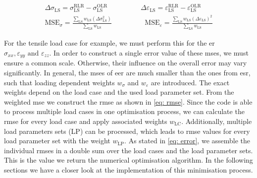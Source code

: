 \begin{gather}
    \label{eq: EMDifference}
    \Delta\sigma_{\scriptscriptstyle\text{LS}} = \sigma_{\scriptscriptstyle\text{LS}}^{\scriptscriptstyle\text{RLR}} - \sigma_{\scriptscriptstyle\text{LS}}^{\scriptscriptstyle\text{OLR}} \hspace{2cm}
    \Delta\varepsilon_{\scriptscriptstyle\text{LS}} = \varepsilon_{\scriptscriptstyle\text{LS}}^{\scriptscriptstyle\text{RLR}} - \varepsilon_{\scriptscriptstyle\text{LS}}^{\scriptscriptstyle\text{OLR}}\\
    \label{eq: mse}
    \text{MSE}_{\sigma} = \frac{\displaystyle\sum_{\text{LS}} w_{\scriptscriptstyle\text{LS}} (\Delta\sigma_{\scriptscriptstyle\text{LS}}^2)}{\displaystyle\sum_{\text{LS}}w_{\scriptscriptstyle\text{LS}} } \hspace{2cm}
    \text{MSE}_{\varepsilon} = \frac{\displaystyle\sum_{\text{LS}} w_{\scriptscriptstyle\text{LS}} (\Delta\varepsilon_{\scriptscriptstyle\text{LS}})^2}{\displaystyle\sum_{\text{LS}}w_{\scriptscriptstyle\text{LS}}}
\end{gather}

For the tensile load case for example, we must perform this for the \acrlong{er} $\sigma_{xx}, \varepsilon_{yy} \text{ and } \varepsilon_{zz}$. 
In order to construct a single error value of these \acrshort{mse}s, we must ensure a common scale. Otherwise, their influence on the overall error may vary significantly.
In general, the \acrshort{mse}s of \acrlong{eer} are much smaller than the ones from \acrlong{esr}, such that loading dependent weights $w_{\sigma}$ and $w_{\varepsilon}$ are introduced. 
The exact weights depend on the load case and the used load parameter set.
From the weighted \acrshort{mse} we construct the \acrshort{rmse} as shown in \autoref{eq: rmse}. 
Since the code is able to process multiple load cases in one optimisation process, we can calculate the \acrshort{rmse} for every load case and apply associated weights $w_{\scriptscriptstyle\text{LC}}$. Additionally, multiple load parameters sets (LP) can be processed, which leads to \acrshort{rmse} values for every load parameter set with the weight $w_{\scriptscriptstyle\text{LP}}$. 
As stated in \autoref{eq: error}, we assemble the individual \acrshort{rmse}s in a double sum over the load cases and the load parameter sets. This  is the value we return the numerical optimisation algorithm. In the following sections we have a closer look at the implementation of this minimisation process. 

